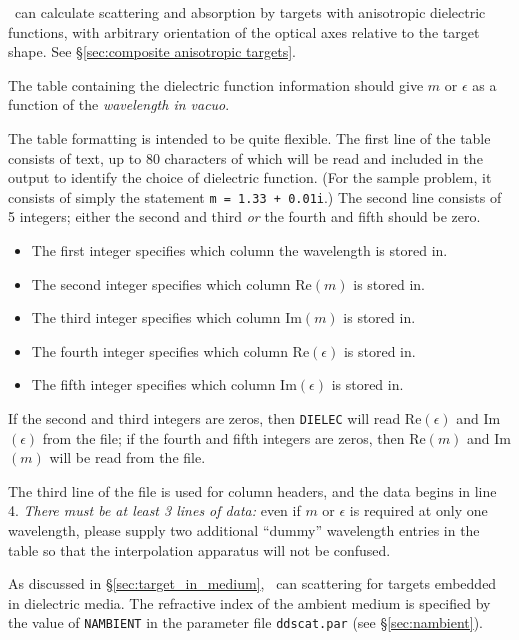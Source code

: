 \ddscatv\ can calculate scattering and absorption by targets with anisotropic
dielectric functions, with arbitrary orientation of the optical axes relative
to the target shape. See \S\ref{sec:composite anisotropic targets}.

The table containing the dielectric function
information should give $m$ or $\epsilon$
as a function of the {\it wavelength in vacuo}.



The table formatting is intended to be quite flexible.  The first line
of the table consists of text, up to 80 characters of which will be
read and included in the output to identify the choice of dielectric
function.  (For the sample problem, it consists of simply the
statement {\tt m = 1.33 + 0.01i}.)  The second line consists of 5
integers; either the second and third {\it or} the fourth and fifth
should be zero.
\begin{itemize}
\item The first integer specifies which column the wavelength is stored in.
\item The second integer specifies which column Re$(m)$ is stored in.
\item The third integer specifies which column Im$(m)$ is stored in.
\item The fourth integer specifies which column Re$(\epsilon)$ is stored in.
\item The fifth integer specifies which column Im$(\epsilon)$ is stored in.
\end{itemize}
If the second and third integers are zeros, then {\tt DIELEC} will
read Re$(\epsilon)$ and Im$(\epsilon)$ from the file; if the fourth
and fifth integers are zeros, then Re$(m)$ and Im$(m)$ will be read
from the file.

The third line of the file is used for column headers, and the data
begins in line 4.  {\it There must be at least 3 lines of data:} even
if $m$ or $\epsilon$ is required at only one wavelength, please supply two
additional ``dummy'' wavelength entries in the table so that the
interpolation apparatus will not be confused.

As discussed in \S\ref{sec:target_in_medium}, \ddscat\ can scattering
for targets embedded in dielectric media.  The refractive index of the
ambient medium is specified by the value of {\tt NAMBIENT} in the
parameter file {\tt ddscat.par} (see \S\ref{sec:nambient}).

